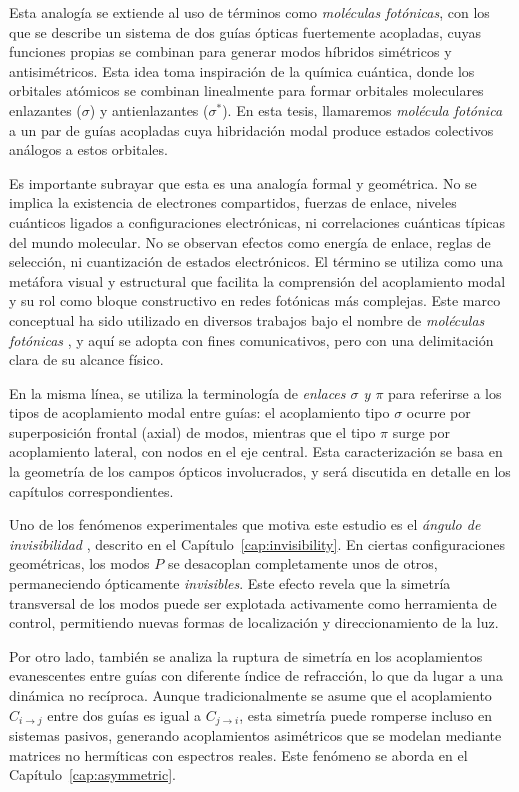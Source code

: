 Esta analogía se extiende al uso de términos como \textit{moléculas fotónicas}, con los que se describe un sistema de dos guías ópticas fuertemente acopladas, cuyas funciones propias se combinan para generar modos híbridos simétricos y antisimétricos. Esta idea toma inspiración de la química cuántica, donde los orbitales atómicos se combinan linealmente para formar orbitales moleculares enlazantes ($\sigma$) y antienlazantes ($\sigma^*$). En esta tesis, llamaremos \textit{molécula fotónica} a un par de guías acopladas cuya hibridación modal produce estados colectivos análogos a estos orbitales.

Es importante subrayar que esta es una analogía formal y geométrica. No se implica la existencia de electrones compartidos, fuerzas de enlace, niveles cuánticos ligados a configuraciones electrónicas, ni correlaciones cuánticas típicas del mundo molecular. No se observan efectos como energía de enlace, reglas de selección, ni cuantización de estados electrónicos. El término se utiliza como una metáfora visual y estructural que facilita la comprensión del acoplamiento modal y su rol como bloque constructivo en redes fotónicas más complejas. Este marco conceptual ha sido utilizado en diversos trabajos bajo el nombre de \textit{moléculas fotónicas} \citep{molecules}, y aquí se adopta con fines comunicativos, pero con una delimitación clara de su alcance físico.

En la misma línea, se utiliza la terminología de \textit{enlaces $\sigma$ y $\pi$} para referirse a los tipos de acoplamiento modal entre guías: el acoplamiento tipo $\sigma$ ocurre por superposición frontal (axial) de modos, mientras que el tipo $\pi$ surge por acoplamiento lateral, con nodos en el eje central. Esta caracterización se basa en la geometría de los campos ópticos involucrados, y será discutida en detalle en los capítulos correspondientes.

Uno de los fenómenos experimentales que motiva este estudio es el \textit{ángulo de invisibilidad} \cite{Pmodecoupling}, descrito en el Capítulo~\ref{cap:invisibility}. En ciertas configuraciones geométricas, los modos $P$ se desacoplan completamente unos de otros, permaneciendo ópticamente \textit{invisibles}. Este efecto revela que la simetría transversal de los modos puede ser explotada activamente como herramienta de control, permitiendo nuevas formas de localización y direccionamiento de la luz.

Por otro lado, también se analiza la ruptura de simetría en los acoplamientos evanescentes entre guías con diferente índice de refracción, lo que da lugar a una dinámica no recíproca. Aunque tradicionalmente se asume que el acoplamiento $C_{i\to j}$ entre dos guías es igual a $C_{j\to i}$, esta simetría puede romperse incluso en sistemas pasivos, generando acoplamientos asimétricos que se modelan mediante matrices no hermíticas con espectros reales. Este fenómeno se aborda en el Capítulo~\ref{cap:asymmetric}.

